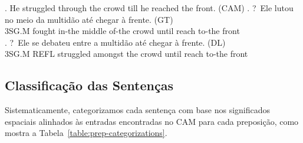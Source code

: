 \documentclass[a4paper, twocolumn, 11pt, twoside]{article}
\begin{document}
\footnotesize
\ex. He struggled through the crowd till he reached the front. (CAM) \label{example:through1} 
\ag. ?~Ele lutou no meio da multidão até chegar à frente. (GT) \\ 
3SG.M fought in-the middle of-the crowd until reach to-the front \\ 
\medskip
\bg. ?~Ele se debateu entre a multidão até chegar à frente. (DL) \\ 
3SG.M REFL struggled amongst the crowd until reach to-the front \\ 
\par
\normalsize

\subsection{Classificação das Sentenças}


Sistematicamente, categorizamos cada sentença com base nos significados espaciais alinhados às entradas encontradas no CAM para cada preposição, 
como mostra a Tabela~\ref{table:prep-categorizations}.
\end{document}
